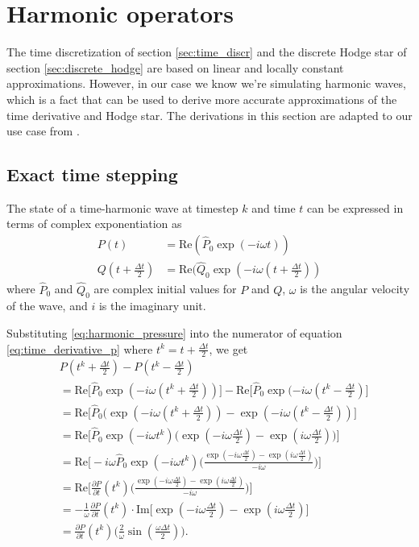 \documentclass[utf8,english]{gradu3}
\begin{document}
\section{Harmonic operators}\label{sec:harmonic_operators}

The time discretization of section \ref{sec:time_discr}
and the discrete Hodge star of section \ref{sec:discrete_hodge}
are based on linear and locally constant approximations.
However, in our case we know we're simulating harmonic waves,
which is a fact that can be used to derive more accurate approximations
of the time derivative and Hodge star.
The derivations in this section are adapted to our use case
from \parencite{rabina_numerical_2014}.


\subsection{Exact time stepping}\label{sec:exact_timestep}

The state of a time-harmonic wave at timestep $k$ and time $t$
can be expressed in terms of complex exponentiation as
\begin{align}
\label{eq:harmonic_pressure}
P(t) &= \text{Re}(\hat{P}_0 \exp(-i\omega t)) \\
\label{eq:harmonic_flux}
Q(t + \frac{\Delta t}{2}) &= \text{Re}(\hat{Q}_0 \exp(-i\omega (t + \frac{\Delta t}{2}))
\end{align}
where $\hat{P}_0$ and $\hat{Q}_0$ are complex initial values for $P$ and $Q$,
$\omega$ is the angular velocity of the wave, and $i$ is the imaginary unit.

Substituting \eqref{eq:harmonic_pressure}
into the numerator of equation \eqref{eq:time_derivative_p}
where $t^k = t + \frac{\Delta t}{2}$, we get
\begin{align*}
& P(t^k + \frac{\Delta t}{2}) - P(t^k - \frac{\Delta t}{2}) \\
&= \text{Re} \Big[ \hat{P}_0 \exp(-i\omega (t^k + \frac{\Delta t}{2})) \Big]
- \text{Re} \Big[ \hat{P}_0 \exp(-i\omega (t^k - \frac{\Delta t}{2}) \Big] \\
&= \text{Re} \Big[ \hat{P}_0 (\exp(-i\omega (t^k + \frac{\Delta t}{2}))
- \exp(-i\omega (t^k - \frac{\Delta t}{2})) \Big] \\
&= \text{Re} \Big[ \hat{P}_0 \exp(-i\omega t^k)
\Big( \exp(-i\omega \frac{\Delta t}{2}) - \exp(i\omega \frac{\Delta t}{2}) \Big) \Big] \\
&= \text{Re} \Big[ -i\omega \hat{P}_0 \exp(-i\omega t^k)
\Big(\frac{\exp(-i\omega \frac{\Delta t}{2}) - \exp(i\omega \frac{\Delta t}{2})}{-i\omega}\Big) \Big] \\
&= \text{Re} \Big[ \frac{\partial P}{\partial t}(t^k)
\Big(\frac{\exp(-i\omega \frac{\Delta t}{2}) - \exp(i\omega \frac{\Delta t}{2})}{-i\omega}\Big) \Big] \\
&= - \frac{1}{\omega} \frac{\partial P}{\partial t}(t^k)
\cdot \text{Im} \Big[\exp(-i\omega \frac{\Delta t}{2}) - \exp(i\omega \frac{\Delta t}{2}) \Big] \\
&= \frac{\partial P}{\partial t}(t^k) \Big(\frac{2}{\omega} \sin(\frac{\omega \Delta t}{2}) \Big).
\end{align*}
\end{document}
